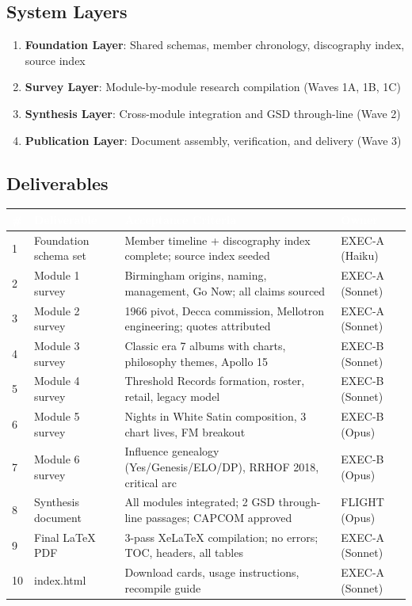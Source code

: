 \documentclass[11pt,letterpaper]{article}
\newcommand{\tableheader}[1]{\textbf{\sffamily\textcolor{white}{#1}}}
\begin{document}
\subsection{System Layers}

\begin{enumerate}[leftmargin=*]
  \item \textbf{Foundation Layer}: Shared schemas, member chronology, discography index, source index
  \item \textbf{Survey Layer}: Module-by-module research compilation (Waves 1A, 1B, 1C)
  \item \textbf{Synthesis Layer}: Cross-module integration and GSD through-line (Wave 2)
  \item \textbf{Publication Layer}: Document assembly, verification, and delivery (Wave 3)
\end{enumerate}

\subsection{Deliverables}

\begin{center}
\begin{tabularx}{\textwidth}{C{0.6cm}L{3.5cm}XL{2.5cm}}
\toprule
{}
\tableheader{\#} & \tableheader{Deliverable} & \tableheader{Acceptance Criteria} & \tableheader{Owner} \\
 & Foundation schema set & Member timeline + discography index complete; source index seeded & EXEC-A (Haiku) \\
2 & Module 1 survey & Birmingham origins, naming, management, Go Now; all claims sourced & EXEC-A (Sonnet) \\
3 & Module 2 survey & 1966 pivot, Decca commission, Mellotron engineering; quotes attributed & EXEC-A (Sonnet) \\
4 & Module 3 survey & Classic era 7 albums with charts, philosophy themes, Apollo 15 & EXEC-B (Sonnet) \\
5 & Module 4 survey & Threshold Records formation, roster, retail, legacy model & EXEC-B (Sonnet) \\
6 & Module 5 survey & Nights in White Satin composition, 3 chart lives, FM breakout & EXEC-B (Opus) \\
7 & Module 6 survey & Influence genealogy (Yes/Genesis/ELO/DP), RRHOF 2018, critical arc & EXEC-B (Opus) \\
8 & Synthesis document & All modules integrated; 2 GSD through-line passages; CAPCOM approved & FLIGHT (Opus) \\
9 & Final LaTeX PDF & 3-pass XeLaTeX compilation; no errors; TOC, headers, all tables & EXEC-A (Sonnet) \\
10 & index.html & Download cards, usage instructions, recompile guide & EXEC-A (Sonnet) \\
\bottomrule
\end{tabularx}
\end{center}
\end{document}
